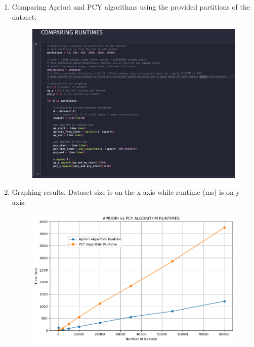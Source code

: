 \documentclass{article}
\begin{document}
\begin{enumerate}[label=\alph*., left=10pt, itemsep=10pt]
        \item \begin{minipage}[t]{0.9\textwidth}
            Comparing Apriori and PCY algorithms using the provided partitions
            of the dataset:
            \begin{figure}[H]
                \centering
                \includegraphics[width=1\textwidth, height=0.4\textheight]{./c.png}
            \end{figure}
        \end{minipage}

        \item \begin{minipage}[t]{0.9\textwidth}
            Graphing results. Dataset size is on the x-axis while runtime (ms) is on y-axis:
            \begin{figure}[H]
                \centering
                \includegraphics[width=1\textwidth, height=0.35\textheight]{./d.png}
            \end{figure}
        \end{minipage}


\end{enumerate}
\end{document}
